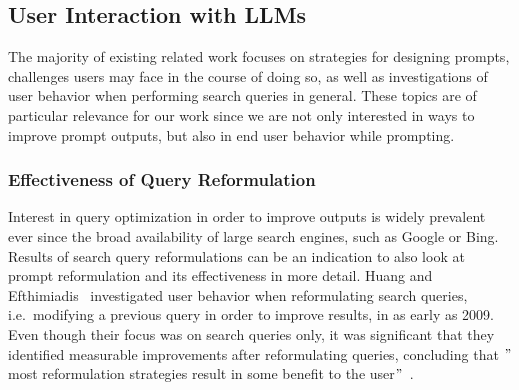 
\subsection{User Interaction with LLMs}
\label{subsec:user-interaction-with-llms}
The majority of existing related work focuses on strategies for designing prompts,
challenges users may face in the course of doing so, as well as investigations of user behavior when
performing search queries in general.
These topics are of particular relevance for our work since we are not only interested in ways to
improve prompt outputs, but also in end user behavior while prompting.

\subsubsection{Effectiveness of Query Reformulation}
Interest in query optimization in order to improve outputs is widely prevalent ever since the broad
availability of large search engines, such as Google or Bing.
Results of search query reformulations can be an indication to also look at prompt reformulation
and its effectiveness in more detail.
Huang and Efthimiadis~\cite{huang_analyzing_2009} investigated user behavior when reformulating search
queries, i.e.\ modifying a previous query in order to improve results, in as early as 2009.
Even though their focus was on search queries only, it was significant that they identified
measurable improvements after reformulating queries, concluding that
\("\)most reformulation strategies result in some benefit to the user\("\)~\cite[p. 1]{huang_analyzing_2009}.


